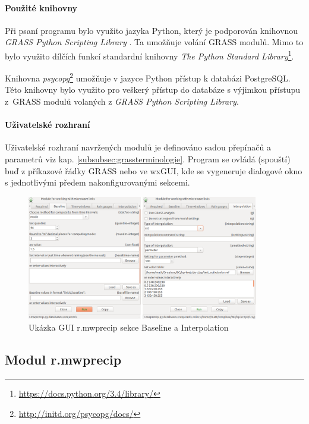 \documentclass[a4paper,12pt,oneside]{report}
\begin{document}
 


\paragraph*{Použité knihovny} Při psaní programu bylo využito jazyka Python, který je podporován
knihovnou \textit{GRASS Python Scripting Library} \cite{spygrass}. Ta
umožňuje volání GRASS modulů. Mimo to bylo využito dílčích funkcí standardní
knihovny \textit{The Python Standard
  Library}\footnote{\url{https://docs.python.org/3.4/library/}}.

Knihovna \textit{psycopg}\footnote{\url{http://initd.org/psycopg/docs/}}
umožňuje v jazyce Python přístup k databázi PostgreSQL. Této knihovny
bylo využito pro veškerý přístup do databáze s výjimkou přístupu z~GRASS
modulů volaných z \textit{GRASS Python Scripting Library}.

\paragraph*{Uživatelské rozhraní}
Uživatelské rozhraní navržených modulů je definováno sadou přepínačů
a~ para\-metrů viz kap. \ref{subsubsec:grassterminologie}. Program se
ovládá (spouští) buď z příkazové řádky GRASS nebo ve wxGUI, kde se
vygeneruje dialogové okno s jednotlivými předem nakonfigu\-rovanými
sekcemi.

\begin{figure}[h!]
    \centering
    \includegraphics[width=0.9\textwidth]{./img/grass/gui.png}
    \caption[GUI modul]{Ukázka GUI r.mwprecip sekce Baseline a Interpolation  \centering  }
        \label{fig:baseline}
 \end{figure}


\subsection{Modul r.mwprecip}
\end{document}
